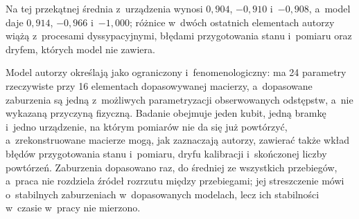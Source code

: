 Na tej przekątnej średnia z~urządzenia wynosi $0{,}904$, $-0{,}910$ i~$-0{,}908$, a~model daje $0{,}914$, $-0{,}966$ i~$-1{,}000$; różnice w~dwóch ostatnich elementach autorzy wiążą z~procesami dyssypacyjnymi, błędami przygotowania stanu i~pomiaru oraz dryfem, których model nie zawiera.

Model autorzy określają jako ograniczony i~fenomenologiczny: ma 24 parametry rzeczywiste przy 16 elementach dopasowywanej macierzy, a~dopasowane zaburzenia są jedną z~możliwych parametryzacji obserwowanych odstępstw, a~nie wykazaną przyczyną fizyczną.
Badanie obejmuje jeden kubit, jedną bramkę i~jedno urządzenie, na którym pomiarów nie da się już powtórzyć, a~zrekonstruowane macierze mogą, jak zaznaczają autorzy, zawierać także wkład błędów przygotowania stanu i~pomiaru, dryfu kalibracji i~skończonej liczby powtórzeń.
Zaburzenia dopasowano raz, do średniej ze wszystkich przebiegów, a~praca nie rozdziela źródeł rozrzutu między przebiegami; jej streszczenie mówi o~stabilnych zaburzeniach w~dopasowanych modelach, lecz ich stabilności w~czasie w~pracy nie mierzono.
